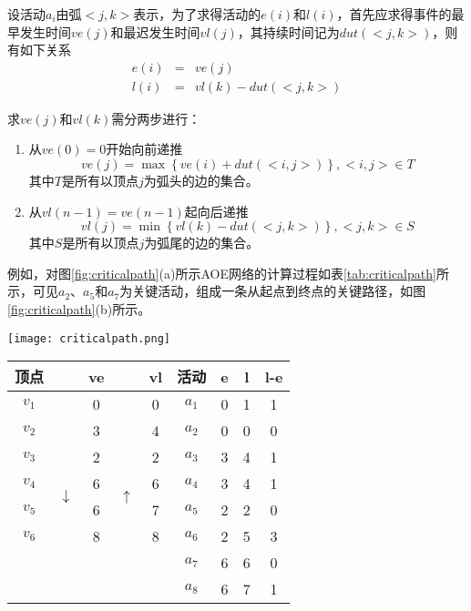 设活动$a_i$由弧$<j, k>$表示，为了求得活动的$e(i)$和$l(i)$，首先应求得事件的最早发生时间$ve(j)$和最迟发生时间$vl(j)$，其持续时间记为$dut(<j, k>)$，则有如下关系
\begin{eqnarray}
e(i) &=& ve(j) \nonumber \\
l(i) &=& vl(k)-dut(<j, k>) \nonumber
\end{eqnarray}

求$ve(j)$和$vl(k)$需分两步进行：
\begin{enumerate}
\item 从$ve(0)=0$开始向前递推
$$
ve(j)=\max\left\{ve(i)+dut(<i, j>)\right\}, <i, j> \in T
$$
其中$T$是所有以顶点$j$为弧头的边的集合。
\item 从$vl(n-1)=ve(n-1)$起向后递推
$$
vl(j)=\min\left\{vl(k)-dut(<j, k>)\right\}, <j, k> \in S
$$
其中$S$是所有以顶点$j$为弧尾的边的集合。
\end{enumerate}

例如，对图\ref{fig:criticalpath}(a)所示AOE网络的计算过程如表\ref{tab:criticalpath}所示，可见$a_2$、$a_5$和$a_7$为关键活动，组成一条从起点到终点的关键路径，如图\ref{fig:criticalpath}(b)所示。

\begin{center}
\texttt{[image: criticalpath.png]}\\
\label{fig:criticalpath}
\end{center}

\begin{center}
\label{tab:criticalpath}
\begin{tabular}{|ccccc|cccc|}
\hline
\textbf{顶点} & & \textbf{ve} & & \textbf{vl} & \textbf{活动} & \textbf{e} & \textbf{l} & \textbf{l-e} \\
\hline
$v_1$ & \multirow{8}{*}{$\downarrow$} & 0 & \multirow{8}{*}{$\uparrow$} & 0 & $a_1$ & 0 & 1 & 1 \\
$v_2$ &                               & 3 &                             & 4 & $a_2$ & 0 & 0 & 0 \\
$v_3$ &                               & 2 &                             & 2 & $a_3$ & 3 & 4 & 1 \\
$v_4$ &                               & 6 &                             & 6 & $a_4$ & 3 & 4 & 1 \\
$v_5$ &                               & 6 &                             & 7 & $a_5$ & 2 & 2 & 0 \\
$v_6$ &                               & 8 &                             & 8 & $a_6$ & 2 & 5 & 3 \\
      &                               &   &                             &   & $a_7$ & 6 & 6 & 0 \\
      &                               &   &                             &   & $a_8$ & 6 & 7 & 1 \\
\hline
\end{tabular}
\end{center}


